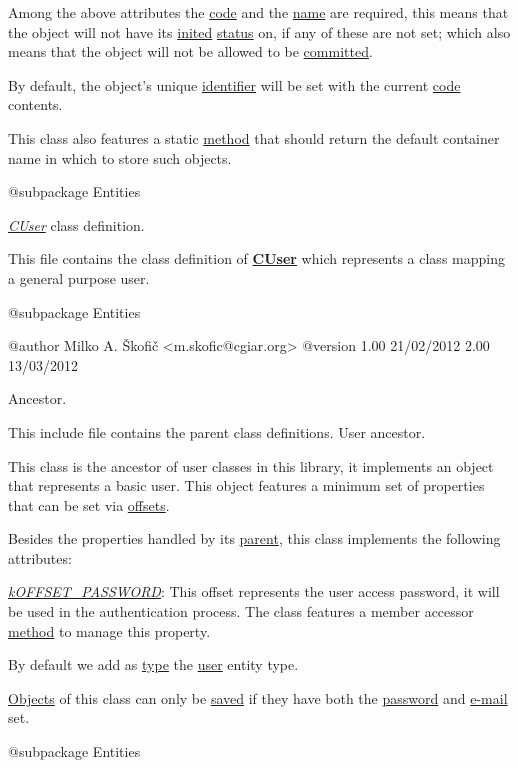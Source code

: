 Among the above attributes the \hyperlink{}{code} and the \hyperlink{}{name} are required, this means that the object will not have its \hyperlink{}{inited} \hyperlink{}{status} on, if any of these are not set; which also means that the object will not be allowed to be \hyperlink{}{committed}.

By default, the object's unique \hyperlink{}{identifier} will be set with the current \hyperlink{}{code} contents.

This class also features a static \hyperlink{}{method} that should return the default container name in which to store such objects.

\begin{DoxyVerb}    @subpackage     Entities\end{DoxyVerb}


{\itshape \hyperlink{class_c_user}{C\-User}\/} class definition.

This file contains the class definition of {\bfseries \hyperlink{class_c_user}{C\-User}} which represents a class mapping a general purpose user.

\begin{DoxyVerb}    @subpackage     Entities

    @author         Milko A. Škofič <m.skofic@cgiar.org>
    @version        1.00 21/02/2012
                            2.00 13/03/2012\end{DoxyVerb}


Ancestor.

This include file contains the parent class definitions. User ancestor.

This class is the ancestor of user classes in this library, it implements an object that represents a basic user. This object features a minimum set of properties that can be set via \hyperlink{}{offsets}.

Besides the properties handled by its \hyperlink{class_c_entity}{parent}, this class implements the following attributes\-:


\begin{DoxyItemize}
\item {\itshape \hyperlink{}{k\-O\-F\-F\-S\-E\-T\-\_\-\-P\-A\-S\-S\-W\-O\-R\-D}\/}\-: This offset represents the user access password, it will be used in the authentication process. The class features a member accessor \hyperlink{}{method} to manage this property. 
\end{DoxyItemize}

By default we add as \hyperlink{}{type} the \hyperlink{}{user} entity type.

\hyperlink{namespace_objects}{Objects} of this class can only be \hyperlink{}{saved} if they have both the \hyperlink{}{password} and \hyperlink{}{e-\/mail} set.

\begin{DoxyVerb}    @subpackage     Entities\end{DoxyVerb}
 
